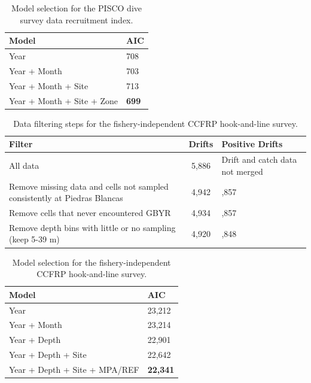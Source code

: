 \documentclass[12pt,]{article}
\begin{document}
\vspace{3cm}

\begin{table}[ht]
\centering
\caption{Model selection for the PISCO dive survey data recruitment index.} 
\label{tab:Fleet8age0_AIC}
\begin{tabular}{ll}
  \hline
Model & AIC \\ 
  \hline
Year & 708 \\ 
  Year + Month & 703 \\ 
  Year + Month + Site & 713 \\ 
  Year + Month + Site + Zone & \textbf{699} \\ 
   \hline
\end{tabular}
\end{table}

\begin{table}[ht]
\centering
\caption{Data filtering steps for the fishery-independent CCFRP hook-and-line survey.} 
\label{tab:Fleet9_Filter}
\begin{tabular}{>{\raggedright}p{3.5in}c>{\centering}p{1.4in}}
  \hline
Filter & Drifts & Positive Drifts \\ 
  \hline
All data & 5,886 & Drift and catch data not merged \\ 
  Remove missing data and cells not sampled consistently at Piedras Blancas & 4,942 & 3,857 \\ 
  Remove cells that never encountered GBYR & 4,934 & 3,857 \\ 
  Remove depth bins with little or no sampling (keep 5-39 m) & 4,920 & 3,848 \\ 
   \hline
\end{tabular}
\end{table}

\vspace{3cm}

\begin{table}[ht]
\centering
\caption{Model selection for the fishery-independent CCFRP hook-and-line survey.} 
\label{tab:Fleet9_AIC}
\begin{tabular}{ll}
  \hline
Model & AIC \\ 
  \hline
Year & 23,212 \\ 
  Year + Month & 23,214 \\ 
  Year + Depth & 22,901 \\ 
  Year + Depth + Site & 22,642 \\ 
  Year + Depth + Site + MPA/REF & \textbf{22,341} \\ 
   \hline
\end{tabular}
\end{table}
\end{document}
